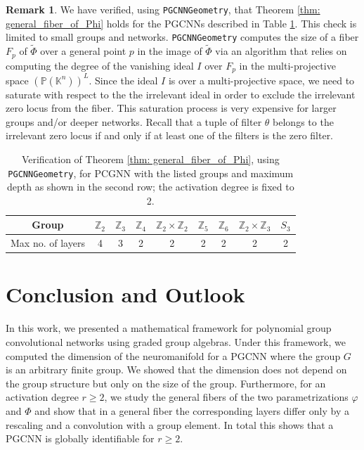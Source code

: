\documentclass[final]{article}
\newcommand{\K}{\mathbb{K}}
\newcommand{\PP}{\mathbb{P}}
\theoremstyle{definition}
\newtheorem{remark}[definition]{Remark}
\theoremstyle{plain}
\begin{document}
\begin{remark}\label{rmk:fiber_computation}
We have verified, using \texttt{PGCNNGeometry}, that Theorem \ref{thm: general_fiber_of_Phi} holds for the PGCNNs described in Table \ref{tab:Phi_general_fiber_checks}.  
This check is limited to small groups and networks. \texttt{PGCNNGeometry}  computes the size of  a fiber $F_p$ of $\tilde \Phi$ over a general point  $p$ in the image of $\tilde \Phi$ via an algorithm that relies on computing the degree of the vanishing ideal $I$ over $F_p$ in the multi-projective space $(\PP(\K^n))^L$.
Since the ideal $I$ is over a multi-projective space, we need to saturate with respect to the the irrelevant ideal in order to exclude the irrelevant zero locus from the fiber. This saturation process is very expensive for larger groups and/or deeper networks.
Recall that a tuple of filter $\theta$ belongs to the irrelevant zero locus if and only if at least one of the filters is the zero filter.
\begin{table}[h]
    \centering
    \begin{tabular}{c|c |c|c|c |c|c|c |c}
        Group &  $\mathbb{Z}_2$ & 
         $\mathbb{Z}_3$ & 
         $\mathbb{Z}_4$ & 
         $\mathbb{Z}_2 \times \mathbb{Z}_2$ & 
         $\mathbb{Z}_5$ &
         $\mathbb{Z}_6$ &
         $\mathbb{Z}_2 \times \mathbb{Z}_3$ & 
         $S_3$\\
         \hline
         Max no. of layers & 4 & 3 & 2 &
         2 &2 &2 &2 &2 
         
    \end{tabular}
    \caption{Verification of Theorem \ref{thm: general_fiber_of_Phi}, using \texttt{PGCNNGeometry}, for PCGNN with the listed groups and maximum depth as shown in the second row; the activation degree is fixed to 2.} 
    
    \label{tab:Phi_general_fiber_checks}
\end{table}
\end{remark}











\section{Conclusion and Outlook}
In this work, we presented a mathematical framework for polynomial group convolutional networks using graded group algebras.
Under this framework, we computed the dimension of the neuromanifold for a PGCNN where the group $G$ is an arbitrary finite group.
We showed that the dimension does not depend on the group structure but only on the size of the group. 
Furthermore, for an activation degree $r\geq 2$, we study the general fibers of the two parametrizations $\varphi$ and $\Phi$ and show that in a general fiber the corresponding layers differ only by a rescaling and a convolution with a group element. In total this shows that a PGCNN is globally identifiable for $r\geq 2$.
\end{document}

